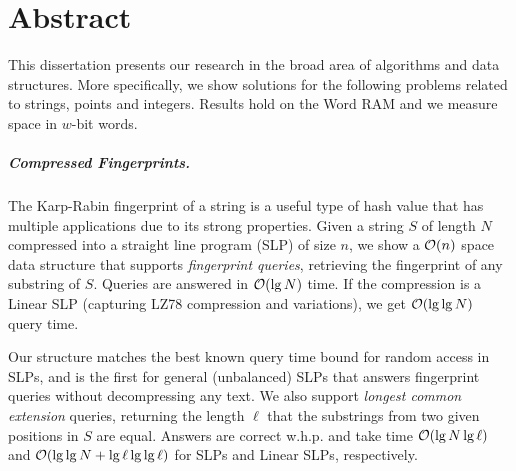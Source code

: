 \chapter{Abstract}
This dissertation presents our research in the broad area of algorithms and data structures.
More specifically, we show solutions for the following problems related to strings, points and integers. Results hold on the Word RAM and we measure space in $w$-bit words.


\paragraph{Compressed Fingerprints.}
The Karp-Rabin fingerprint of a string is a useful type of hash value that has multiple applications due to its strong properties. 
Given a string $S$ of length $N$ compressed into a straight line program (SLP) of size $n$, we show a $\mathcal{O}(n)$ space data structure that supports \emph{fingerprint queries}, retrieving the fingerprint of any substring of $S$.
Queries are answered in $\mathcal{O}(\lg N)$ time. If the compression is a Linear SLP (capturing LZ78 compression and variations), we get $\mathcal{O}(\lg \lg N)$ query time.

Our structure matches the best known query time bound for random access in SLPs, and is the first for general (unbalanced) SLPs that answers fingerprint queries without decompressing any text. 
We also support \emph{longest common extension} queries, returning the length $\ell$ that the substrings from two given positions in $S$ are equal. Answers are correct w.h.p. and take time $\mathcal{O}(\lg N \lg \ell)$ and $\mathcal{O}(\lg \lg N + \lg \ell \lg \lg \ell)$ for SLPs and Linear SLPs, respectively. 


